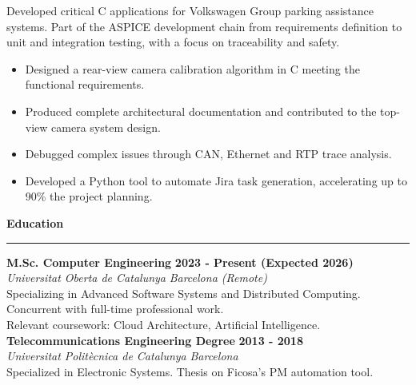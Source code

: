 \documentclass[11pt,a4paper]{article}
\newcommand{\cvsection}[1]{
    \vspace{0.5em}
    \noindent\textbf{\large #1}
    \vspace{0.5em}
    \hrule\vspace{0.5em}
}
\begin{document}
\begin{minipage}[t]{0.68\textwidth}
    Developed critical C applications for Volkswagen Group parking assistance systems. Part of the ASPICE development chain from requirements definition to unit and integration testing, 
    with a focus on traceability and safety.
    \begin{itemize}[leftmargin=*,topsep=2pt,itemsep=-1pt]
        \item Designed a rear-view camera calibration algorithm in C meeting the functional requirements.
        \item Produced complete architectural documentation and contributed to the top-view camera system design.
        \item Debugged complex issues through CAN, Ethernet and RTP trace analysis.
        \item Developed a Python tool to automate Jira task generation, accelerating up to 90\% the project planning.
    \end{itemize}
    
    \cvsection{Education}
    \noindent
    \textbf{M.Sc. Computer Engineering} \hfill \textbf{2023 - Present (Expected 2026)} \\
    \textit{Universitat Oberta de Catalunya} \hfill \textit{Barcelona (Remote)} \\
    Specializing in Advanced Software Systems and Distributed Computing.\\
    Concurrent with full-time professional work.\\
    Relevant coursework: Cloud Architecture, Artificial Intelligence.\\
    \noindent
    \textbf{Telecommunications Engineering Degree} \hfill \textbf{2013 - 2018} \\
    \textit{Universitat Politècnica de Catalunya} \hfill \textit{Barcelona}\\
    Specialized in Electronic Systems. Thesis on Ficosa's PM automation tool.\\    
\end{minipage}
\hspace{0.02\textwidth} %
\end{document}
